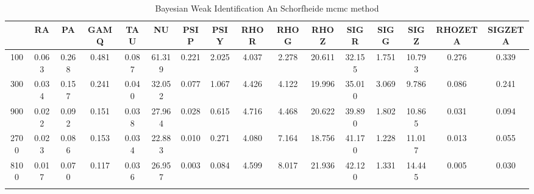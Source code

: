 \documentclass[a4paper,10pt]{article}
\begin{document}
\centering
\begin{longtable}{cccccccccccccccc}
\toprule
 & RA & PA & GAMQ & TAU & NU & PSIP & PSIY & RHOR & RHOG & RHOZ & SIGR & SIGG & SIGZ & RHOZETA & SIGZETA \\
\midrule
100 & 0.063 & 0.268 & 0.481 & 0.087 & 61.319 & 0.221 & 2.025 & 4.037 & 2.278 & 20.611 & 32.155 & 1.751 & 10.793 & 0.276 & 0.339 \\
300 & 0.034 & 0.157 & 0.241 & 0.040 & 32.052 & 0.077 & 1.067 & 4.426 & 4.122 & 19.996 & 35.010 & 3.069 & 9.786 & 0.086 & 0.241 \\
900 & 0.022 & 0.092 & 0.151 & 0.038 & 27.964 & 0.028 & 0.615 & 4.716 & 4.468 & 20.622 & 39.890 & 1.802 & 10.865 & 0.031 & 0.094 \\
2700 & 0.023 & 0.086 & 0.153 & 0.034 & 22.883 & 0.010 & 0.271 & 4.080 & 7.164 & 18.756 & 41.170 & 1.228 & 11.017 & 0.013 & 0.055 \\
8100 & 0.017 & 0.070 & 0.117 & 0.036 & 26.957 & 0.003 & 0.084 & 4.599 & 8.017 & 21.936 & 42.120 & 1.331 & 14.445 & 0.005 & 0.030 \\
\bottomrule
\caption{Bayesian Weak Identification An Schorfheide mcmc method}
\label{table:tbl:WeakAnScho_mcmc}
\end{longtable}
\end{document}
